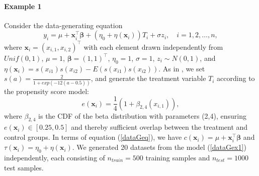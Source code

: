 \documentclass[11pt]{article}
\newcommand{\bx}{{\boldsymbol x}}
\newcommand{\bbeta}{{\boldsymbol \beta}}
\begin{document}
\paragraph{Example 1} Consider the data-generating equation  
\begin{equation} \label{dataGex1}
y_i=\mu+\bx_i^{\top} \bbeta+(\eta_0 +\eta(\bx_i)) T_i +\sigma z_i, \quad i=1,2,\ldots,n,
\end{equation}
where $\bx_i=(x_{i,1},x_{i,2})^{\top}$ with each element drawn independently from $Unif(0,1)$, 
$\mu=1$, $\bbeta=(1,1)^{\top}$, $\eta_0=1$, $\sigma=1$,  $z_i \sim N(0,1)$, and 
$\eta(\bx_i)=s(x_{i1})s(x_{i2})-E(s(x_{i1})s(x_{i2}))$. 
As in \cite{lei2021ite}, we set $s(a)=\frac{2}{1+exp(-12(a-0.5))}$, and generate 
 the treatment variable $T_i$ according to the  propensity score model:
\begin{equation} \label{propensityeq}
e(\bx_i)=\frac{1}{4}(1+\beta_{2,4}(x_{i,1})),
\end{equation}
where $\beta_{2,4}$ is the CDF of the beta distribution with parameters (2,4), ensuring $e(\bx_i) \in [0.25,0.5]$ and thereby sufficient overlap between the treatment and control groups.
In terms of equation (\ref{dataGeq}), we have $c(\bx_i)=\mu+\bx_i^{\top}\bbeta$ and $\tau(\bx_i)=\eta_0 +\eta(\bx_i)$. 
We generated 20 datasets from  the model (\ref{dataGex1}) independently, each consisting of $n_{train}=500$ training samples and $n_{test}=1000$ test samples.
\end{document}
